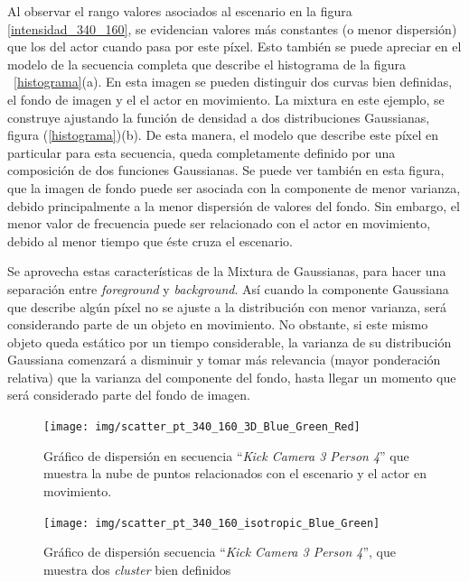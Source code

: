 Al observar el rango valores asociados al escenario en la figura \ref{intensidad_340_160}, se evidencian valores más constantes (o menor dispersión) que los del actor cuando pasa por este píxel. Esto también se puede apreciar en el modelo de la secuencia completa que describe el histograma de la figura ~\ref{histograma}(a). En esta imagen se pueden distinguir dos curvas bien definidas, el fondo de imagen y el el actor en movimiento. La mixtura en este ejemplo, se construye ajustando la función de densidad a dos distribuciones Gaussianas, figura (\ref{histograma})(b). De esta manera, el modelo que describe este píxel en particular para esta secuencia, queda completamente definido por una composición de dos funciones Gaussianas. Se puede ver también en esta figura, que la imagen de fondo puede ser asociada con la componente de menor varianza, debido principalmente a la menor dispersión de valores del fondo. Sin embargo, el menor valor de frecuencia puede ser relacionado con el actor en movimiento, debido al menor tiempo que éste cruza el escenario. 

Se aprovecha estas características de la Mixtura de Gaussianas, para hacer una separación entre \textit{foreground} y \textit{background}. Así cuando la componente Gaussiana que describe algún píxel no se ajuste a la distribución con menor varianza, será considerando parte de un objeto en movimiento. No obstante, si este mismo objeto queda estático por un tiempo considerable, la varianza de su distribución Gaussiana comenzará a disminuir y tomar más relevancia (mayor ponderación relativa) que la varianza del componente del fondo, hasta llegar un momento que será considerado parte del fondo de imagen.




\begin{figure}[h!]
  \centering
      \texttt{[image: img/scatter\_pt\_340\_160\_3D\_Blue\_Green\_Red]}
  \caption[Gráfico dispersión 3D secuencia completa ``\textit{Kick Camera 3 Person 4}'']{Gráfico de dispersión en secuencia ``\textit{Kick Camera 3 Person 4}'' que muestra la nube de puntos relacionados con el escenario y el actor en movimiento.}
\label{scatter_3D}
\end{figure}

\begin{figure}[h!]
  \centering
      \texttt{[image: img/scatter\_pt\_340\_160\_isotropic\_Blue\_Green]}
  \caption[Gráfico dispersión 2D secuencia completa ``\textit{Kick Camera 3 Person 4}'']{Gráfico de dispersión secuencia ``\textit{Kick Camera 3 Person 4}'', que muestra dos \textit{cluster} bien definidos}
\label{scatter_2D}
\end{figure}

